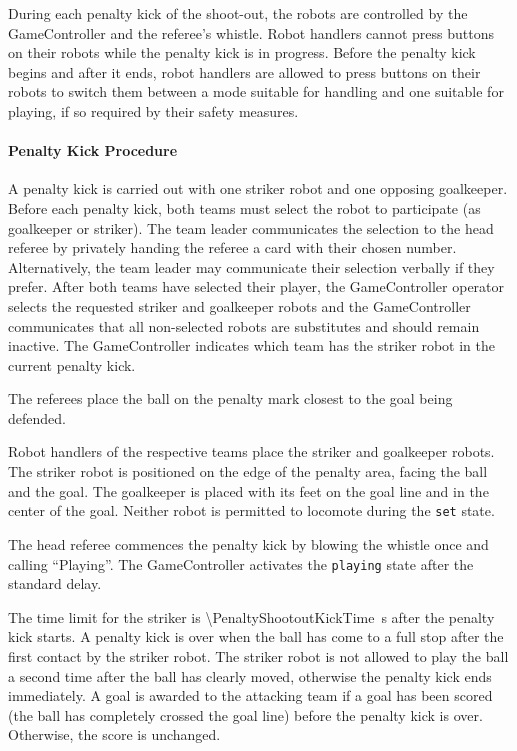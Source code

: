 During each penalty kick of the shoot-out, the robots are controlled by the GameController and the referee's whistle. Robot handlers cannot press buttons on their robots while the penalty kick is in progress. Before the penalty kick begins and after it ends, robot handlers are allowed to press buttons on their robots to switch them between a mode suitable for handling and one suitable for playing, if so required by their safety measures.

\paragraph{Penalty Kick Procedure}
\label{sec:pso_kick}

A penalty kick is carried out with one striker robot and one opposing goalkeeper. Before each penalty kick, both teams must select the robot to participate (as goalkeeper or striker). The team leader communicates the selection to the head referee by privately handing the referee a card with their chosen number. Alternatively, the team leader may communicate their selection verbally if they prefer. After both teams have selected their player, the GameController operator selects the requested striker and goalkeeper robots and the GameController communicates that all non-selected robots are substitutes and should remain inactive. The GameController indicates which team has the striker robot in the current penalty kick.

The referees place the ball on the penalty mark closest to the goal being defended.

Robot handlers of the respective teams place the striker and goalkeeper robots. The striker robot is positioned on the edge of the penalty area, facing the ball and the goal. The goalkeeper is placed with its feet on the goal line and in the center of the goal. Neither robot is permitted to locomote during the \texttt{set} state.

The head referee commences the penalty kick by blowing the whistle once and calling ``Playing''. The GameController activates the \texttt{playing} state after the standard delay.

The time limit for the striker is \qty{\PenaltyShootoutKickTime}{\second} after the penalty kick starts. A penalty kick is over when the ball has come to a full stop after the first contact by the striker robot. The striker robot is not allowed to play the ball a second time after the ball has clearly moved, otherwise the penalty kick ends immediately. A goal is awarded to the attacking team if a goal has been scored (the ball has completely crossed the goal line) before the penalty kick is over. Otherwise, the score is unchanged.

